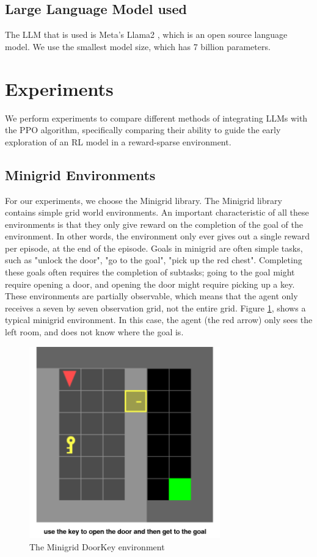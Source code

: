 \documentclass[conference]{IEEEtran}
\begin{document}
\subsection{Large Language Model used}

The LLM that is used is Meta's Llama2 \cite{llama}, which is an open source language model. We use the smallest model size, which has 7 billion parameters.

\section{Experiments}

We perform experiments to compare different methods of integrating LLMs with the PPO algorithm, specifically comparing their ability to guide the early exploration of an RL model in a reward-sparse environment.

\subsection{Minigrid Environments}

For our experiments, we choose the Minigrid library. The Minigrid library contains simple grid world environments. An important characteristic of all these environments is that they only give reward on the completion of the goal of the environment. In other words, the environment only ever gives out a single reward per episode, at the end of the episode. Goals in minigrid are often simple tasks, such as "unlock the door", "go to the goal", "pick up the red chest". Completing these goals often requires the completion of subtasks; going to the goal might require opening a door, and opening the door might require picking up a key. These environments are partially observable, which means that the agent only receives a seven by seven observation grid, not the entire grid. Figure \ref{doorkeyenv}, shows a typical minigrid environment. In this case, the agent (the red arrow) only sees the left room, and does not know where the goal is.

\begin{figure}[h]
\centerline{\includegraphics[width=3.25in]{figure/doorkeyenv.png}}
\caption{The Minigrid DoorKey environment}
\label{doorkeyenv}
\end{figure}
\end{document}
